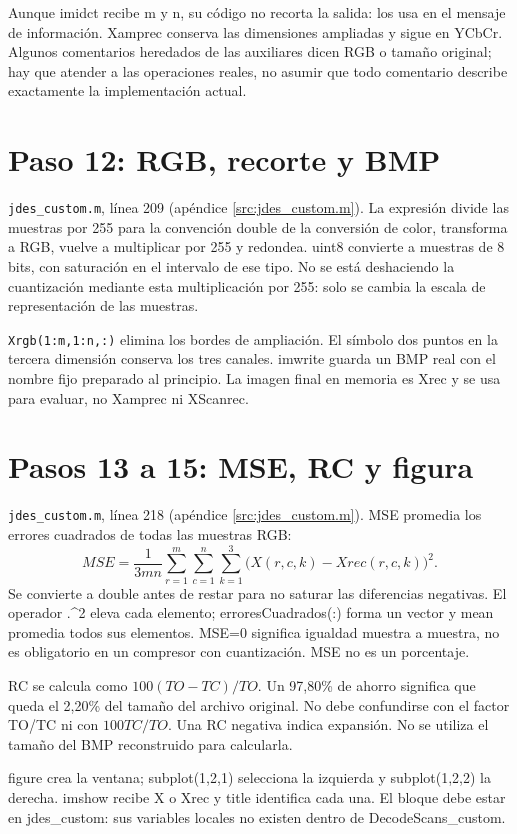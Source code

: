 \documentclass[11pt,a4paper,oneside]{report}
\begin{document}
Aunque imidct recibe m y n, su código no recorta la salida: los usa en el
mensaje de información. Xamprec conserva las dimensiones ampliadas y sigue
en YCbCr. Algunos comentarios heredados de las auxiliares dicen RGB o tamaño
original; hay que atender a las operaciones reales, no asumir que todo comentario
describe exactamente la implementación actual.


\section{Paso 12: RGB, recorte y BMP}
\texttt{jdes\_custom.m}, línea 209 (apéndice \ref{src:jdes_custom.m}).
La expresión divide las muestras por 255 para la convención double de la
conversión de color, transforma a RGB, vuelve a multiplicar por 255 y redondea.
uint8 convierte a muestras de 8 bits, con saturación en el intervalo de ese tipo.
No se está deshaciendo la cuantización mediante esta multiplicación por 255:
solo se cambia la escala de representación de las muestras.

\texttt{Xrgb(1:m,1:n,:)} elimina los bordes de ampliación. El símbolo dos puntos
en la tercera dimensión conserva los tres canales. imwrite guarda un BMP
real con el nombre fijo preparado al principio. La imagen final en memoria
es Xrec y se usa para evaluar, no Xamprec ni XScanrec.


\section{Pasos 13 a 15: MSE, RC y figura}
\texttt{jdes\_custom.m}, línea 218 (apéndice \ref{src:jdes_custom.m}).
MSE promedia los errores cuadrados de todas las muestras RGB:
\[
MSE=\frac{1}{3mn}\sum_{r=1}^m\sum_{c=1}^n
\sum_{k=1}^{3}\bigl(X(r,c,k)-Xrec(r,c,k)\bigr)^2.
\]
Se convierte a double antes de restar para no saturar las diferencias negativas.
El operador .\^{}2 eleva cada elemento; erroresCuadrados(:) forma un vector y
mean promedia todos sus elementos. MSE=0 significa igualdad muestra a muestra,
no es obligatorio en un compresor con cuantización. MSE no es un porcentaje.

RC se calcula como $100(TO-TC)/TO$. Un 97,80\% de ahorro significa que queda
el 2,20\% del tamaño del archivo original. No debe confundirse con el factor
TO/TC ni con $100TC/TO$. Una RC negativa indica expansión. No se utiliza
el tamaño del BMP reconstruido para calcularla.

figure crea la ventana; subplot(1,2,1) selecciona la izquierda y subplot(1,2,2)
la derecha. imshow recibe X o Xrec y title identifica cada una. El bloque debe
estar en jdes\_custom: sus variables locales no existen dentro de DecodeScans\_custom.
\end{document}
